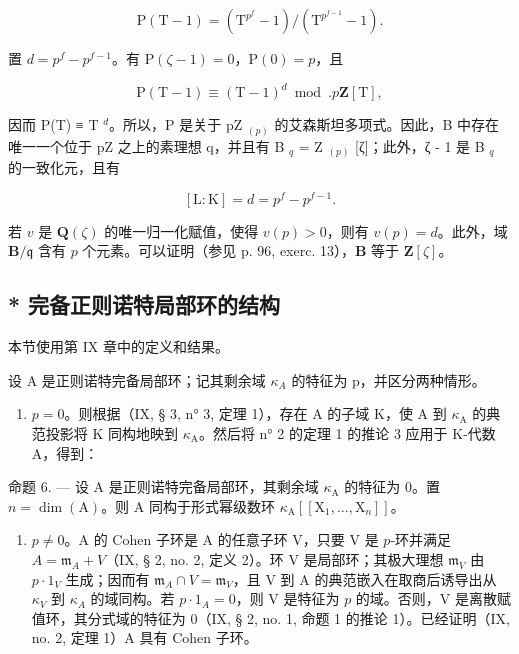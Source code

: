 \[
\mathrm{P} (\mathrm{T} - 1) = \left(\mathrm{T} ^ {p^{f}} - 1\right) / \left(\mathrm{T} ^ {p^{f - 1}} - 1\right).
\]

置 \(d = p^{f} - p^{f - 1}\)。有 \(\mathrm{P}(\zeta - 1) = 0\)，\(\mathrm{P}(0) = p\)，且

\[
\mathrm{P} (\mathrm{T} - 1) \equiv (\mathrm{T} - 1) ^ {d} \bmod . p \mathbf {Z} [ \mathrm{T} ],
\]

因而 P(T) ≡ T \(^{d}\)。所以，P 是关于 pZ \(_{(p)}\) 的艾森斯坦多项式。因此，B 中存在唯一一个位于 pZ 之上的素理想 q，并且有 B \(_{q}\) = Z \(_{(p)}\) {[}ζ{]}；此外，ζ - 1 是 B \(_{q}\) 的一致化元，且有

\[
[ \mathrm{L}: \mathrm{K} ] = d = p ^ {f} - p ^ {f - 1}.
\]

若 \(v\) 是 \(\mathbf{Q}(\zeta)\) 的唯一归一化赋值，使得 \(v(p)>0\)，则有 \(v(p)=d\)。此外，域 \(\mathbf{B}/\mathfrak{q}\) 含有 \(p\) 个元素。可以证明（参见 p. 96, exerc. 13），\(\mathbf{B}\) 等于 \(\mathbf{Z}[\zeta]\)。



\subsection{* 完备正则诺特局部环的结构}

本节使用第 IX 章中的定义和结果。

设 A 是正则诺特完备局部环；记其剩余域 \(\kappa_{A}\) 的特征为 p，并区分两种情形。

\begin{enumerate}
\def\labelenumi{\Alph{enumi})}
\tightlist
\item
  \(p = 0\)。则根据（IX, § 3, n° 3, 定理 1），存在 A 的子域 K，使 A 到 \(\kappa_{\mathrm{A}}\) 的典范投影将 K 同构地映到 \(\kappa_{\mathrm{A}}\)。然后将 n° 2 的定理 1 的推论 3 应用于 K-代数 A，得到：
\end{enumerate}

命题 6. --- 设 A 是正则诺特完备局部环，其剩余域 \(\kappa_{\mathrm{A}}\) 的特征为 0。置 \(n = \dim(\mathrm{A})\)。则 A 同构于形式幂级数环 \(\kappa_{\mathrm{A}}[[\mathrm{X}_{1}, ..., \mathrm{X}_{n}]]\)。

\begin{enumerate}
\def\labelenumi{\Alph{enumi})}
\setcounter{enumi}{1}
\tightlist
\item
  \(p \neq 0\)。A 的 Cohen 子环是 A 的任意子环 V，只要 V 是 \(p\)-环并满足 \(A = \mathfrak{m}_{A} + V\)（IX, § 2, no. 2, 定义 2）。环 V 是局部环；其极大理想 \(\mathfrak{m}_{V}\) 由 \(p \cdot 1_{V}\) 生成；因而有 \(\mathfrak{m}_{A} \cap V = \mathfrak{m}_{V}\)，且 V 到 A 的典范嵌入在取商后诱导出从 \(\kappa_{V}\) 到 \(\kappa_{A}\) 的域同构。若 \(p \cdot 1_{A} = 0\)，则 V 是特征为 \(p\) 的域。否则，V 是离散赋值环，其分式域的特征为 0（IX, § 2, no. 1, 命题 1 的推论 1）。已经证明（IX, no. 2, 定理 1）A 具有 Cohen 子环。
\end{enumerate}

